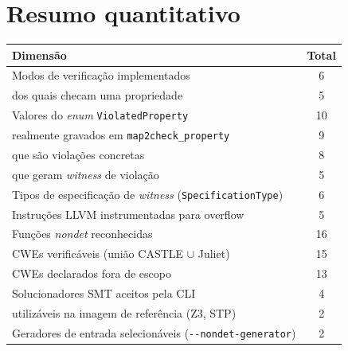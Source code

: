 \documentclass[11pt,a4paper]{article}
\newcommand{\code}[1]{\texttt{#1}}
\newcommand{\flag}[1]{\texttt{-\/-#1}}
\begin{document}
\section{Resumo quantitativo}

\begin{table}[H]
\centering
\small
\begin{tabularx}{\textwidth}{@{}Y c@{}}
\toprule
\textbf{Dimensão} & \textbf{Total} \\
\midrule
Modos de verificação implementados & 6 \\
\quad dos quais checam uma propriedade & 5 \\
Valores do \emph{enum} \code{ViolatedProperty} & 10 \\
\quad realmente gravados em \code{map2check\_property} & 9 \\
\quad que são violações concretas & 8 \\
\quad que geram \emph{witness} de violação & 5 \\
Tipos de especificação de \emph{witness} (\code{SpecificationType}) & 6 \\
Instruções LLVM instrumentadas para overflow & 5 \\
Funções \emph{nondet} reconhecidas & 16 \\
CWEs verificáveis (união CASTLE $\cup$ Juliet) & 15 \\
CWEs declarados fora de escopo & 13 \\
Solucionadores SMT aceitos pela CLI & 4 \\
\quad utilizáveis na imagem de referência (Z3, STP) & 2 \\
Geradores de entrada selecionáveis (\flag{nondet-generator}) & 2 \\
\bottomrule
\end{tabularx}
\end{table}
\end{document}
